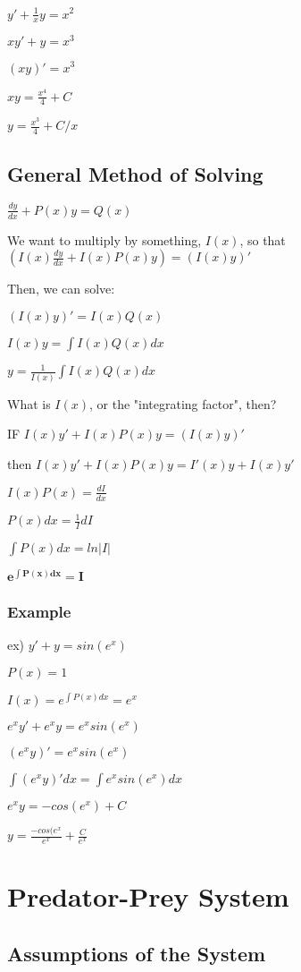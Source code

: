 \documentclass{article}
\begin{document}
$y' + \frac{1}{x} y = x^2$

$xy' + y = x^3$

$(xy)' = x^3$

$xy = \frac{x^4}{4} + C$

$y = \frac{x^3}{4} + C/x$

\subsection{General Method of Solving}

$\frac{dy}{dx} + P(x)y = Q(x)$

We want to multiply by something, $I(x)$, so that $(I(x)\frac{dy}{dx}+I(x)P(x)y) = (I(x)y)'$

Then, we can solve:

$(I(x)y)' = I(x)Q(x)$

$I(x)y = \int I(x) Q(x) dx$

$y = \frac{1}{I(x)} \int I(x) Q(x) dx$

What is $I(x)$, or the "integrating factor", then?

IF $I(x)y' + I(x)P(x)y = (I(x)y)'$ 

then $I(x)y' + I(x)P(x)y = I'(x)y + I(x)y'$

$I(x)P(x) = \frac{dI}{dx}$

$P(x)dx = \frac{1}{I} dI$

$\int P(x) dx = ln |I|$

$\mathbf{e^{\int P(x) dx} = I }$

\subsubsection{Example}
ex) $y' + y = sin(e^x)$

$P(x) = 1$

$I(x) = e^{\int P(x) dx} = e^x$

$e^x y' + e^x y = e^x sin(e^x)$

$(e^x y)' = e^x sin(e^x)$

$\int (e^x y)' dx = \int e^x sin(e^x) dx$

$e^x y = -cos(e^x)+C$

$y = \frac{-cos(e^x}{e^x} + \frac{C}{e^x}$

\section{Predator-Prey System}

\subsection{Assumptions of the System}
\end{document}
